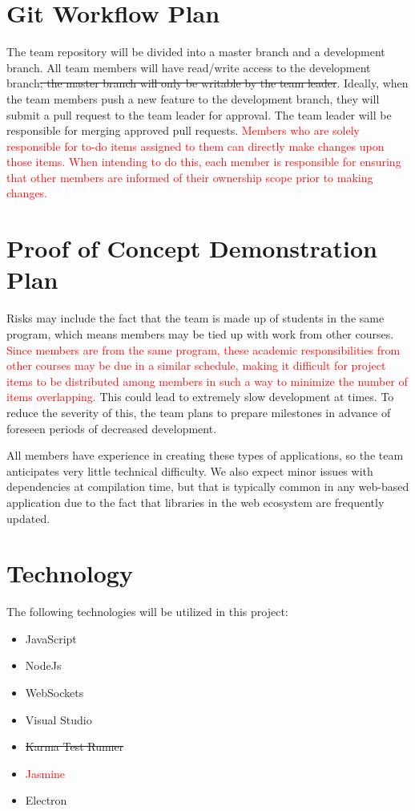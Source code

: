 \documentclass{article}
\begin{document}
\section{Git Workflow Plan}
The team repository will be divided into a master branch and a development branch. All team members will have read/write access to the development branch\sout{; the master branch will only be writable by the team leader}. Ideally, when the team members push a new feature to the development branch, they will submit a pull request to the team leader for approval. The team leader will be responsible for merging approved pull requests. \textcolor{red}{Members who are solely responsible for to-do items assigned to them can directly make changes upon those items. When intending to do this, each member is responsible for ensuring that other members are informed of their ownership scope prior to making changes.}

\section{Proof of Concept Demonstration Plan}
Risks may include the fact that the team is made up of students in the same program, which means members may be tied up with work from other courses. \textcolor{red}{Since members are from the same program, these academic responsibilities from other courses may be due in a similar schedule, making it difficult for project items to be distributed among members in such a way to minimize the number of items overlapping.} This could lead to extremely slow development at times. To reduce the severity of this, the team plans to prepare milestones in advance of foreseen periods of decreased development. 

All members have experience in creating these types of applications, so the team anticipates very little technical difficulty. We also expect minor issues with dependencies at compilation time, but that is typically common in any web-based application due to the fact that libraries in the web ecosystem are frequently updated. 


\section{Technology}
The following technologies will be utilized in this project: 
\begin{itemize}
    \item JavaScript
    \item NodeJs
    \item WebSockets
    \item Visual Studio
    \item \sout{Karma Test Runner}
    \item \textcolor{red}{Jasmine}
    \item Electron
\end{itemize}
\end{document}
